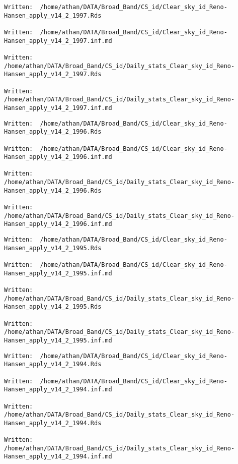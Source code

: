 \documentclass[
  10pt,
  a4paper,oneside]{article}
\begin{document}
\begin{verbatim}
Written:  /home/athan/DATA/Broad_Band/CS_id/Clear_sky_id_Reno-Hansen_apply_v14_2_1997.Rds 

Written:  /home/athan/DATA/Broad_Band/CS_id/Clear_sky_id_Reno-Hansen_apply_v14_2_1997.inf.md 

Written:  /home/athan/DATA/Broad_Band/CS_id/Daily_stats_Clear_sky_id_Reno-Hansen_apply_v14_2_1997.Rds 

Written:  /home/athan/DATA/Broad_Band/CS_id/Daily_stats_Clear_sky_id_Reno-Hansen_apply_v14_2_1997.inf.md 
\end{verbatim}

\begin{verbatim}
Written:  /home/athan/DATA/Broad_Band/CS_id/Clear_sky_id_Reno-Hansen_apply_v14_2_1996.Rds 

Written:  /home/athan/DATA/Broad_Band/CS_id/Clear_sky_id_Reno-Hansen_apply_v14_2_1996.inf.md 

Written:  /home/athan/DATA/Broad_Band/CS_id/Daily_stats_Clear_sky_id_Reno-Hansen_apply_v14_2_1996.Rds 

Written:  /home/athan/DATA/Broad_Band/CS_id/Daily_stats_Clear_sky_id_Reno-Hansen_apply_v14_2_1996.inf.md 
\end{verbatim}

\begin{verbatim}
Written:  /home/athan/DATA/Broad_Band/CS_id/Clear_sky_id_Reno-Hansen_apply_v14_2_1995.Rds 

Written:  /home/athan/DATA/Broad_Band/CS_id/Clear_sky_id_Reno-Hansen_apply_v14_2_1995.inf.md 

Written:  /home/athan/DATA/Broad_Band/CS_id/Daily_stats_Clear_sky_id_Reno-Hansen_apply_v14_2_1995.Rds 

Written:  /home/athan/DATA/Broad_Band/CS_id/Daily_stats_Clear_sky_id_Reno-Hansen_apply_v14_2_1995.inf.md 
\end{verbatim}

\begin{verbatim}
Written:  /home/athan/DATA/Broad_Band/CS_id/Clear_sky_id_Reno-Hansen_apply_v14_2_1994.Rds 

Written:  /home/athan/DATA/Broad_Band/CS_id/Clear_sky_id_Reno-Hansen_apply_v14_2_1994.inf.md 

Written:  /home/athan/DATA/Broad_Band/CS_id/Daily_stats_Clear_sky_id_Reno-Hansen_apply_v14_2_1994.Rds 

Written:  /home/athan/DATA/Broad_Band/CS_id/Daily_stats_Clear_sky_id_Reno-Hansen_apply_v14_2_1994.inf.md 
\end{verbatim}
\end{document}
